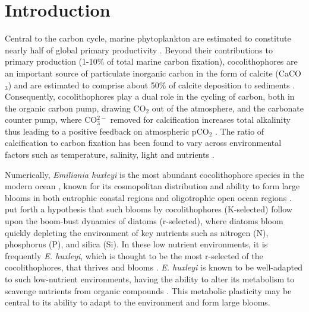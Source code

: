  


\section{Introduction}
Central to the carbon cycle, marine phytoplankton are estimated to constitute nearly half of global primary productivity \citep{Field1998}. Beyond their contributions to primary production (1-10\% of total marine carbon fixation), cocolithophores are an important source of particulate inorganic carbon in the form of calcite (CaCO$_{3}$) and are estimated to comprise about 50\% of calcite deposition to sediments \citep{Poulton2007}. Consequently, cocolithophores play a dual role in the cycling of carbon, both in the organic carbon pump, drawing CO$_2$ out of the atmosphere, and the carbonate counter pump, where CO$_{3}^{2-}$ removed for calcification increases total alkalinity thus leading to a positive feedback on atmospheric pCO$_2$ \citep{Zondervan2002}. The ratio of calcification to carbon fixation has been found to vary across environmental factors such as temperature, salinity, light and nutrients \citep{Paasche2001, Bollmann2007, Zondervan2007, Feng2008}. \par

Numerically, \textit{Emiliania huxleyi} is the most abundant cocolithophore species in the modern ocean \citep{Paasche2001}, known for its cosmopolitan distribution and ability to form large blooms in both eutrophic coastal regions and oligotrophic open ocean regions \citep{Holligan1993, Brown1994}. \citet{Margalef1978} put forth a hypothesis that such blooms by cocolithophores (K-selected) follow upon the boom-bust dynamics of diatoms (r-selected), where diatoms bloom quickly depleting the environment of key nutrients such as nitrogen (N), phosphorus (P), and silica (Si). In these low nutrient environments, it is frequently \textit{E. huxleyi}, which is thought to be the most r-selected of the cocolithophores, that thrives and blooms \citep{Litchman2006}. \textit{E. huxleyi} is known to be well-adapted to such low-nutrient environments, having the ability to alter its metabolism to scavenge nutrients from organic compounds \citep{Palenik1997, Dyhrman2003, Bruhn2010, Rouco2013}. This metabolic plasticity may be central to its ability to adapt to the environment and form large blooms.\par

